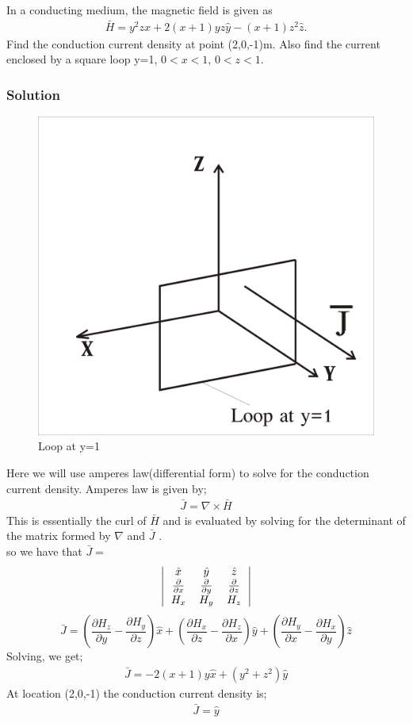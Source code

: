 \begin{exmp}
In a conducting medium, the magnetic field is given as
\begin{align*}
\bar{H}=y^{2}z\hat{x}+2(x+1)yz\hat{y}-(x+1)z^{2}\hat{z}.
\end{align*}
Find the conduction current density at point (2,0,-1)m. Also find the current enclosed by a square loop y=1, $0<x<1$, $0<z<1$.
\subsubsection*{Solution}
\begin{figure}[h]
\centering
\includegraphics[width=.5\linewidth]{graphics/problem3b}
\caption{Loop at y=1}
\end{figure} 

Here we will use amperes law(differential form) to solve for the conduction current density. Amperes law is given by;
\begin{align*}
\bar{J}=\nabla\times\bar{H}
\end{align*}
This is essentially the curl of $\bar{H}$ and is evaluated by solving for the determinant of the matrix formed by $\nabla$ and $\bar{J}$ .\\
so we have that $\bar{J} =$
\[
\left|
\begin{tabular}{c c c}
$\hat{x}$ & $\hat{y}$ & $\hat{z}$\\
$\frac{\partial}{\partial x}$ & $\frac{\partial}{\partial y}$ & $\frac{\partial}{\partial z}$\\
$H_{x}$ & $H_{y}$ & $H_{z}$
\end{tabular}
\right|
\]
\begin{dmath*}
\bar{J}= (\frac{\partial H_{z}}{\partial y}-\frac{\partial H_{y}}{\partial z})\hat{x}+ (\frac{\partial H_{x}}{\partial z}-\frac{\partial H_{z}}{\partial x})\hat{y}+ (\frac{\partial H_{y}}{\partial x}-\frac{\partial H_{x}}{\partial y})\hat{z}
\end{dmath*}
Solving, we get;
\begin{align*}
\bar{J}=-2(x+1)y\hat{x}+(y^{2}+z^{2})\hat{y}
\end{align*}
At location (2,0,-1) the conduction current density is;
\begin{align*}
\bar{J}=\hat{y}
\end{align*}


\end{exmp}
